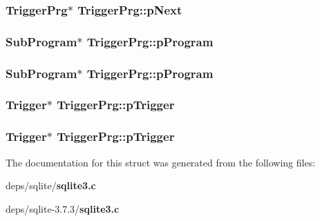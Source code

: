 \subsubsection{\setlength{\rightskip}{0pt plus 5cm}\bf{Trigger\-Prg}$\ast$ \bf{Trigger\-Prg::p\-Next}}\label{structTriggerPrg_60842b3fb3f146014386ccaaec229462}


\subsubsection{\setlength{\rightskip}{0pt plus 5cm}\bf{Sub\-Program}$\ast$ \bf{Trigger\-Prg::p\-Program}}\label{structTriggerPrg_79dfaad69348bbab08a316d7488e174f}


\subsubsection{\setlength{\rightskip}{0pt plus 5cm}\bf{Sub\-Program}$\ast$ \bf{Trigger\-Prg::p\-Program}}\label{structTriggerPrg_79dfaad69348bbab08a316d7488e174f}


\subsubsection{\setlength{\rightskip}{0pt plus 5cm}\bf{Trigger}$\ast$ \bf{Trigger\-Prg::p\-Trigger}}\label{structTriggerPrg_70d0643cf27d2d849418552df0b55105}


\subsubsection{\setlength{\rightskip}{0pt plus 5cm}\bf{Trigger}$\ast$ \bf{Trigger\-Prg::p\-Trigger}}\label{structTriggerPrg_70d0643cf27d2d849418552df0b55105}




The documentation for this struct was generated from the following files:\begin{CompactItemize}
\item 
deps/sqlite/\bf{sqlite3.c}\item 
deps/sqlite-3.7.3/\bf{sqlite3.c}\end{CompactItemize}
